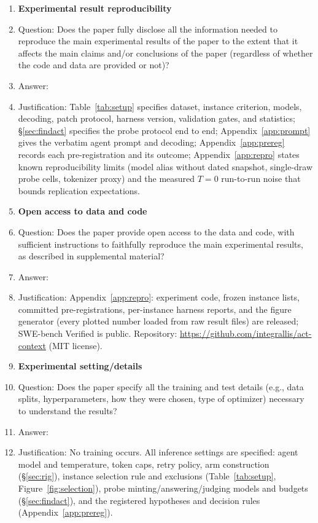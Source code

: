\begin{enumerate}
\item {\bf Experimental result reproducibility}
    \item[] Question: Does the paper fully disclose all the information needed to reproduce the main experimental results of the paper to the extent that it affects the main claims and/or conclusions of the paper (regardless of whether the code and data are provided or not)?
    \item[] Answer: \answerYes{}
    \item[] Justification: Table~\ref{tab:setup} specifies dataset, instance criterion, models, decoding, patch protocol, harness version, validation gates, and statistics; \S\ref{sec:findact} specifies the probe protocol end to end; Appendix~\ref{app:prompt} gives the verbatim agent prompt and decoding; Appendix~\ref{app:prereg} records each pre-registration and its outcome; Appendix~\ref{app:repro} states known reproducibility limits (model alias without dated snapshot, single-draw probe cells, tokenizer proxy) and the measured $T{=}0$ run-to-run noise that bounds replication expectations.

\item {\bf Open access to data and code}
    \item[] Question: Does the paper provide open access to the data and code, with sufficient instructions to faithfully reproduce the main experimental results, as described in supplemental material?
    \item[] Answer: \answerYes{}
    \item[] Justification: Appendix~\ref{app:repro}: experiment code, frozen instance lists, committed pre-registrations, per-instance harness reports, and the figure generator (every plotted number loaded from raw result files) are released; SWE-bench Verified is public. Repository: \url{https://github.com/integrallis/act-context} (MIT license).

\item {\bf Experimental setting/details}
    \item[] Question: Does the paper specify all the training and test details (e.g., data splits, hyperparameters, how they were chosen, type of optimizer) necessary to understand the results?
    \item[] Answer: \answerYes{}
    \item[] Justification: No training occurs. All inference settings are specified: agent model and temperature, token caps, retry policy, arm construction (\S\ref{sec:rig}), instance selection rule and exclusions (Table~\ref{tab:setup}, Figure~\ref{fig:selection}), probe minting/answering/judging models and budgets (\S\ref{sec:findact}), and the registered hypotheses and decision rules (Appendix~\ref{app:prereg}).


\end{enumerate}
